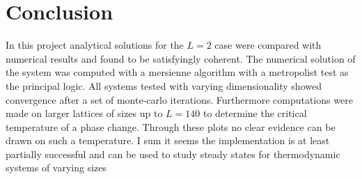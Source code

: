 \documentclass[12pt]{article}
\begin{document}
\section{Conclusion}

In this project analytical solutions for the $L =2$ case were compared with numerical results and found to be satisfyingly coherent. The numerical solution of the system was computed with a mersienne algorithm with a metropolist test as the principal logic. All systems tested with varying dimensionality showed convergence after a set of monte-carlo iterations. Furthermore computations were made on larger lattices of sizes up to $L = 140$ to determine the critical temperature of a phase change. Through these plots no clear evidence can be drawn on such a temperature. I sum it seems the implementation is at least partially successful and can be used to study steady states for thermodynamic systems of varying sizes
\end{document}

